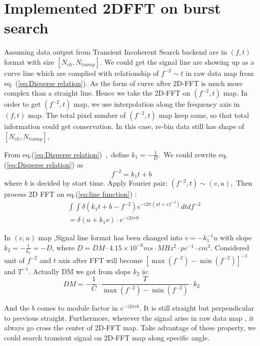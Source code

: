 \documentclass[iop]{emulateapj}
\begin{document}
\section{Implemented 2DFFT on burst search}
Assuming data output from Transient Incoherent Search backend are in $(f,t)$ format with size $[N_{ch},N_{tsamp}]$. We could get the signal line are showing up as a curve line which are complied with relationship of $f^{-2}\sim t$ in raw data map from eq. (\ref{eq:Disperse relation}). As the form of curve after 2D-FFT is much more complex than a straight line. Hence we take the 2D-FFT on $(f^{-2},t)$ map. In order to get $(f^{-2},t)$ map, we use interpolation along the frequency axis in $(f,t)$ map. The total pixel number of $(f^{-2},t)$ map keep same, so that total information could get conservation. In this case, re-bin data still has shape of $[N_{ch},N_{tsamp}]$\label{rebin_shape}, 

From eq.(\ref{eq:Disperse relation})~,~define $k_1 =- \frac{1}{D} $.~We could rewrite eq.(\ref{eq:Disperse relation}) as 
\begin{equation}
f^{-2}=k_1t +b\label{eq:line function}
\end{equation}
where $b$ is decided by start time. Apply Fourier pair:
$(f^{-2},t) \sim (v,u)$,~Then process 2D FFT on eq.(\ref{eq:line function}) :
\begin{equation} \begin{aligned}
&\int\int\delta(k_1t+b-f^{-2})e^{-i2\pi(ut+vf^{-2})}dtdf^{-2}
\\ &=\delta(u+k_1v)\cdot e^{-i2\pi vb}
\end{aligned}
\end{equation}

In $(v,u)$ map ,Signal line format has been changed into $v=-k_1^{-1} u$ with slope $k_2 =-\frac{1}{k_1}=-D$, where $D=DM\cdot4.15 \times 10^{-6} ms \cdot MHz^2 \cdot pc^{-1} \cdot cm^3$. Considered unit of $f^{-2}$ and $t$ axis after FFT will become $[\max(f^{-2}) - \min(f^{-2})]^{-1}$ and $T^{-1}$. Actually DM we got from slope $k_2$ is:
\begin{equation}
DM = -\frac{1}{C}\cdot\frac{T}{\max(f^{-2}) - \min(f^{-2})}\cdot k_2 \label{seq:DM Calculate}
\end{equation}

And the $b$ comes to module factor in $e^{-i2\pi vb}$. It is still straight but perpendicular to previous straight. Furthermore,  wherever the signal arise in raw data map , it always go cross the center of 2D-FFT map. Take advantage of these property, we could search transient signal on 2D-FFT map along specific angle. 
\end{document}
